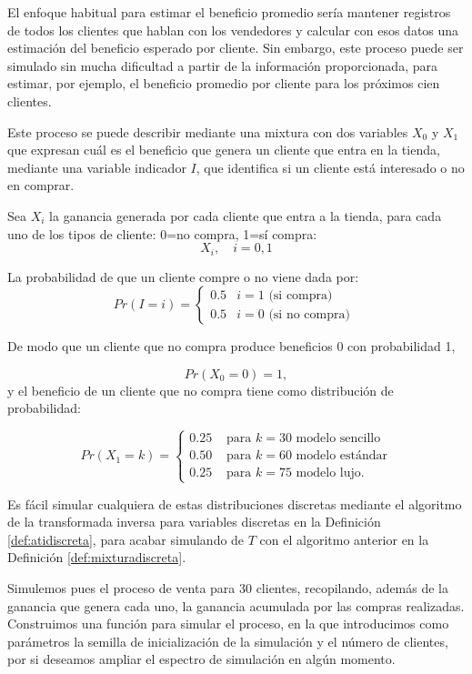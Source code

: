 \documentclass[
]{book}
\theoremstyle{definition}
\theoremstyle{definition}
\theoremstyle{definition}
\theoremstyle{definition}
\theoremstyle{remark}
\begin{document}
El enfoque habitual para estimar el beneficio promedio sería mantener registros de todos los clientes que hablan con los vendedores y calcular con esos datos una estimación del beneficio esperado por cliente. Sin embargo, este proceso puede ser simulado sin mucha dificultad a partir de la información proporcionada, para estimar, por ejemplo, el beneficio promedio por cliente para los próximos cien clientes.

Este proceso se puede describir mediante una mixtura con dos variables \(X_0\) y \(X_1\) que expresan cuál es el beneficio que genera un cliente que entra en la tienda, mediante una variable indicador \(I\), que identifica si un cliente está interesado o no en comprar.

Sea \(X_i\) la ganancia generada por cada cliente que entra a la tienda, para cada uno de los tipos de cliente: 0=no compra, 1=sí compra: \[X_i, \quad i=0,1\]

La probabilidad de que un cliente compre o no viene dada por: \begin{equation*}
Pr(I = i)=
\begin{cases}
0.5 & i=1 \text{ (si compra)} \\
0.5 & i=0 \text{ (si no compra) }
\end{cases}
\end{equation*}

De modo que un cliente que no compra produce beneficios 0 con probabilidad 1,

\[Pr(X_0=0)=1,\] y el beneficio de un cliente que no compra tiene como distribución de probabilidad:

\begin{equation*}
Pr(X_1 = k) = 
\begin{cases}
0.25 & \text{ para } k = 30 \text{ modelo sencillo}\\
0.50 & \text{ para } k = 60 \text{ modelo estándar}\\
0.25 & \text{ para } k = 75 \text{ modelo lujo}.
\end{cases}
\end{equation*}

Es fácil simular cualquiera de estas distribuciones discretas mediante el algoritmo de la transformada inversa para variables discretas en la Definición \ref{def:atidiscreta}, para acabar simulando de \(T\) con el algoritmo anterior en la Definición \ref{def:mixturadiscreta}.

Simulemos pues el proceso de venta para 30 clientes, recopilando, además de la ganancia que genera cada uno, la ganancia acumulada por las compras realizadas. Construimos una función para simular el proceso, en la que introducimos como parámetros la semilla de inicialización de la simulación y el número de clientes, por si deseamos ampliar el espectro de simulación en algún momento.
\end{document}
